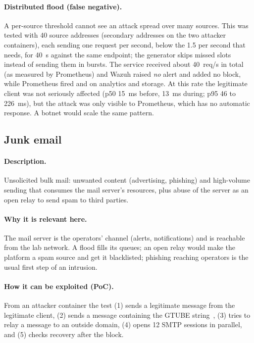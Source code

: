 \paragraph{Distributed flood (false negative).}
A per-source threshold cannot see an attack spread over many sources. This was tested with 40
source addresses (secondary addresses on the two attacker containers), each sending one request
per second, below the 1.5 per second that  needs, for 40~s against the same
endpoint; the generator skips missed slots instead of sending them in bursts. The service received
about 40~req/s in total (as measured by Prometheus) and Wazuh raised \emph{no}  alert
and added no block, while Prometheus fired  and
 on analytics and storage. At this rate the legitimate client was
not seriously affected (p50 15~ms before, 13~ms during; p95 46 to 226~ms), but the attack was only
visible to Prometheus, which has no automatic response. A botnet would scale the same pattern.

\subsection{Junk email}

\paragraph{Description.}
Unsolicited bulk mail: unwanted content (advertising, phishing) and high-volume sending that
consumes the mail server's resources, plus abuse of the server as an open relay to send spam to
third parties.

\paragraph{Why it is relevant here.}
The mail server is the operators' channel (alerts, notifications) and is reachable from the lab
network. A flood fills its queues; an open relay would make the platform a spam source and get it
blacklisted; phishing reaching operators is the usual first step of an intrusion.

\paragraph{How it can be exploited (PoC).}
From an attacker container the test (1) sends a legitimate message from the legitimate client,
(2) sends a message containing the GTUBE string~\cite{spamassassin_gtube}, (3) tries to relay a
message to an outside domain, (4) opens 12 SMTP sessions in parallel, and (5) checks recovery after
the block.

